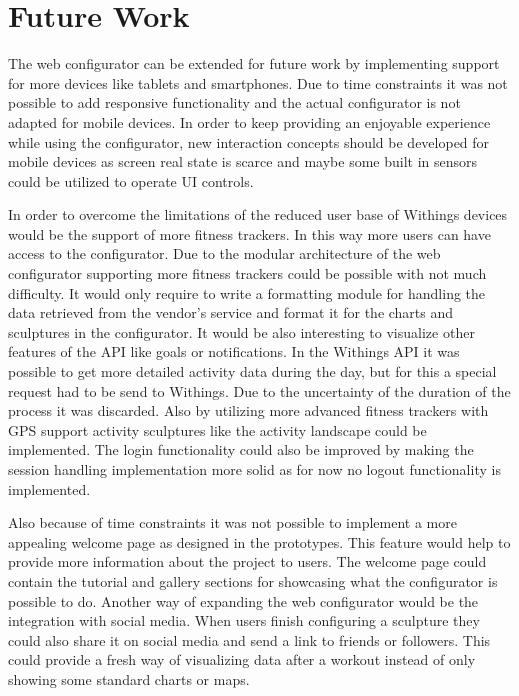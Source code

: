 \documentclass[../medieninformatik-arbeit.tex]{subfiles}
\begin{document}
\section{Future Work}
\label{ch:future}
The web configurator can be extended for future work by implementing support for more devices like tablets and smartphones. Due to time constraints it was not possible to add responsive functionality and the actual configurator is not adapted for mobile devices. In order to keep providing an enjoyable experience while using the configurator, new interaction concepts should be developed for mobile devices as screen real state is scarce and maybe some built in sensors could be utilized to operate UI controls. 

In order to overcome the limitations of the reduced user base of Withings devices would be the support of more fitness trackers. In this way more users can have access to the configurator. Due to the modular architecture of the web configurator supporting more fitness trackers could be possible with not much difficulty. It would only require to write a formatting module for handling the data retrieved from the vendor's service and format it for the charts and sculptures in the configurator. It would be also interesting to visualize other features of the API like goals or notifications. In the Withings API it was possible to get more detailed activity data during the day, but for this a special request had to be send to Withings. Due to the uncertainty of the duration of the process it was discarded. Also by utilizing more advanced fitness trackers with GPS support activity sculptures like the activity landscape could be implemented. The login functionality could also be improved by making the session handling implementation more solid as for now no logout functionality is implemented. 

Also because of time constraints it was not possible to implement a more appealing welcome page as designed in the prototypes. This feature would help to provide more information about the project to users. The welcome page could contain the tutorial and gallery sections for showcasing what the configurator is possible to do. Another way of expanding the web configurator would be the integration with social media. When users finish configuring a sculpture they could also share it on social media and send a link to friends or followers. This could provide a fresh way of visualizing data after a workout instead of only showing some standard charts or maps. 
\end{document}
